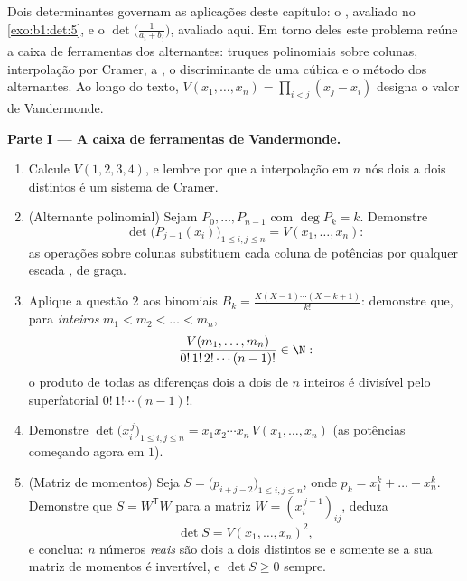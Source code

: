 \begin{problem}\label{pb:b1:det:1}
Dois determinantes governam as aplicações deste capítulo: o
, avaliado no \cref{exo:b1:det:5}, e o
\emph{} $\det\bigl(\frac{1}{a_i +
b_j}\bigr)$, avaliado aqui. Em torno deles
este problema reúne a caixa de ferramentas dos alternantes: truques
polinomiais sobre colunas, interpolação por Cramer, a , o discriminante de uma cúbica e o método dos 
alternantes. Ao longo do texto, $V(x_1,
\dots, x_n) = \prod_{i < j}(x_j - x_i)$ designa o valor de
Vandermonde.

\medskip
\noindent\textbf{Parte I --- A caixa de ferramentas de
Vandermonde.}
\begin{enumerate}
  \item Calcule $V(1, 2, 3, 4)$, e lembre por que a interpolação em $n$ nós
        dois a dois distintos é um sistema de Cramer.
  \item (Alternante polinomial) Sejam $P_0, \dots, P_{n-1}$ \emph{} com
        $\deg P_k = k$. Demonstre
        \[
        \det\bigl(P_{j-1}(x_i)\bigr)_{1 \leq i, j \leq n}
        = V(x_1, \dots, x_n) :
        \]
        as operações sobre colunas substituem cada coluna de
        potências por qualquer escada , de graça.
  \item Aplique a questão 2 aos  binomiais $B_k =
        \frac{X(X-1)\cdots(X-k+1)}{k!}$:
        demonstre que, para \emph{inteiros} $m_1 < m_2 < \dots < m_n$,
        \[
        \frac{V(m_1, \dots, m_n)}{0!\,1!\,2!\cdots(n-1)!}
        \in \N :
        \]
        o produto de todas as diferenças dois a dois de $n$ inteiros
        é divisível pelo superfatorial $0!\,1!\cdots(n-1)!$.
  \item Demonstre $\det\bigl(x_i^{\,j}\bigr)_{1 \leq i, j \leq n} =
        x_1 x_2 \cdots x_n\, V(x_1, \dots, x_n)$ (as potências começando agora em $1$).
  \item (Matriz de momentos) Seja $S = \bigl(p_{i+j-2}\bigr)_{1 \leq
        i, j \leq n}$, onde $p_k = x_1^k + \dots + x_n^k$. Demonstre que
        $S = W^{\mathsf T} W$ para a matriz $W =
        (x_i^{\,j-1})_{ij}$, deduza
        \[
        \det S = V(x_1, \dots, x_n)^2 ,
        \]
        e conclua: $n$ números \emph{reais} são dois a dois
        distintos se e somente se a sua matriz de momentos é
        invertível, e $\det S \geq 0$ sempre.
\end{enumerate}


\end{problem}
